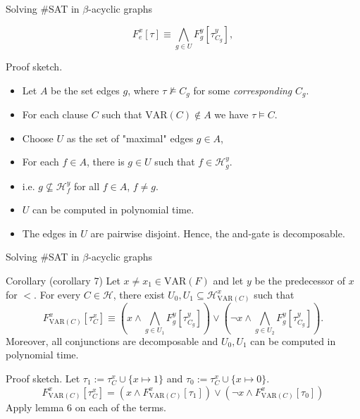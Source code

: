 \begin{frame}[t]{Solving \#SAT in $\beta$-acyclic graphs}
	\vspace{-1cm}
	\begin{center}
		$$ F^x_e[\tau] \equiv \bigwedge\limits_{g \in U} F^y_g[\tau^y_{C_g}],$$
	\end{center}
	Proof sketch.
	\begin{itemize}[<+->]
		\item Let $A$ be the set edges $g$, where $\tau \not \models C_g$ for some {\color{gray} \textit{corresponding}} $C_g$.
		\item For each clause $C$ such that $\mathrm{VAR}(C) \notin A$ we have $\tau \models C$.
		\item Choose $U$ as the set of "maximal" edges $g \in A$,
		\item For each $f \in A$, there is $g \in U$ such that $f \in \mathcal{H}^y_g$.
		\item[]\hspace{1cm}i.e. $g \not \subseteq \mathcal{H}^y_f$ for all $f \in A$, $f \neq g$.
		\item $U$ can be computed in polynomial time.
		\item The edges in $U$ are pairwise disjoint. Hence, the and-gate is  decomposable. 
	\end{itemize}
\end{frame}

\begin{frame}[t]{Solving \#SAT in $\beta$-acyclic graphs}
	\begin{block}{Corollary (corollary 7)}
		Let $x \neq x_1 \in \mathrm{VAR}(F)$ and let $y$ be the predecessor of $x$ for $<$. For every $C \in \mathcal{H}$, there exist $U_0, U_1 \subseteq \mathcal{H}^x_{\mathrm{VAR}(C)}$ such that
		$$F^x_{\mathrm{VAR}(C)}[\tau^x_C] \equiv 
		( x \land \bigwedge\limits_{g \in U_1} F^y_g[\tau^y_{C_g}]) \lor
		( \lnot x \land \bigwedge\limits_{g \in U_2} F^y_g[\tau^y_{C_g}]).
		$$
		Moreover, all conjunctions are decomposable and $U_0, U_1$ can be computed in polynomial time.
	\end{block}

	\pause
	Proof sketch. Let $\tau_1 := \tau^x_C \cup \{x \mapsto 1\}$ and $\tau_0 := \tau^x_C \cup \{x \mapsto 0\}$.
	$$F^x_{\mathrm{VAR}(C)}[\tau^x_C] = (x \land F^x_{\mathrm{VAR}(C)}[\tau_1]) \lor (\lnot x \land F^x_{\mathrm{VAR}(C)}[\tau_0])$$	
		Apply lemma 6 on each of the terms.
\end{frame}

